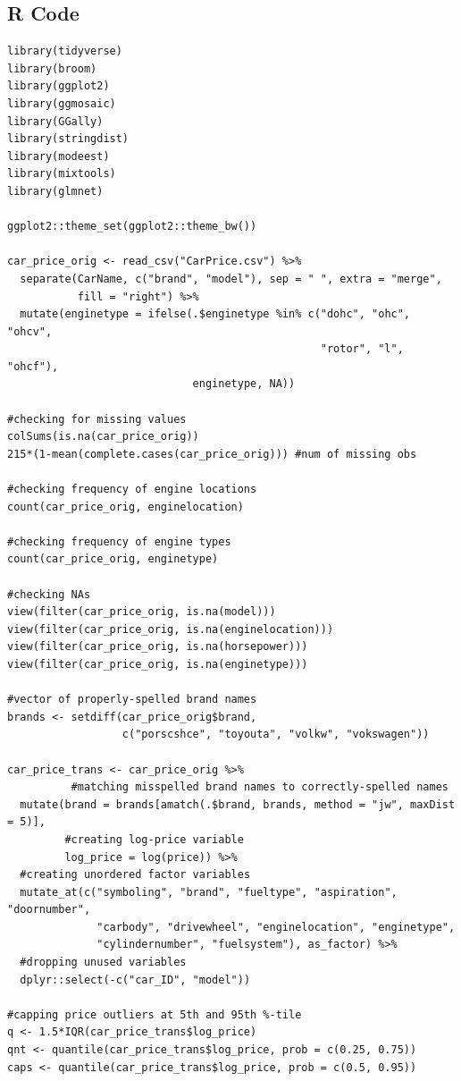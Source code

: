 \documentclass[a4paper, 10pt, titlepage]{article}
\begin{document}
\subsection{R Code}
\begin{lstlisting}[basicstyle = \footnotesize \ttfamily]
library(tidyverse)
library(broom)
library(ggplot2)
library(ggmosaic)
library(GGally)
library(stringdist)
library(modeest)
library(mixtools)
library(glmnet)

ggplot2::theme_set(ggplot2::theme_bw())

car_price_orig <- read_csv("CarPrice.csv") %>%
  separate(CarName, c("brand", "model"), sep = " ", extra = "merge", 
           fill = "right") %>%
  mutate(enginetype = ifelse(.$enginetype %in% c("dohc", "ohc", "ohcv",
                                                 "rotor", "l", "ohcf"), 
                             enginetype, NA))

#checking for missing values
colSums(is.na(car_price_orig))
215*(1-mean(complete.cases(car_price_orig))) #num of missing obs

#checking frequency of engine locations
count(car_price_orig, enginelocation)

#checking frequency of engine types
count(car_price_orig, enginetype)

#checking NAs
view(filter(car_price_orig, is.na(model)))
view(filter(car_price_orig, is.na(enginelocation)))
view(filter(car_price_orig, is.na(horsepower)))
view(filter(car_price_orig, is.na(enginetype)))

#vector of properly-spelled brand names
brands <- setdiff(car_price_orig$brand, 
                  c("porscshce", "toyouta", "volkw", "vokswagen"))

car_price_trans <- car_price_orig %>%
          #matching misspelled brand names to correctly-spelled names
  mutate(brand = brands[amatch(.$brand, brands, method = "jw", maxDist = 5)],
         #creating log-price variable
         log_price = log(price)) %>%
  #creating unordered factor variables
  mutate_at(c("symboling", "brand", "fueltype", "aspiration", "doornumber",
              "carbody", "drivewheel", "enginelocation", "enginetype", 
              "cylindernumber", "fuelsystem"), as_factor) %>%
  #dropping unused variables
  dplyr::select(-c("car_ID", "model"))

#capping price outliers at 5th and 95th %-tile
q <- 1.5*IQR(car_price_trans$log_price)
qnt <- quantile(car_price_trans$log_price, prob = c(0.25, 0.75))
caps <- quantile(car_price_trans$log_price, prob = c(0.5, 0.95))


\end{lstlisting}
\end{document}

